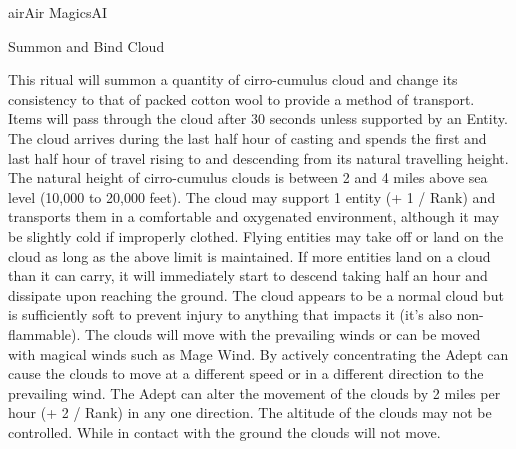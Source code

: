 \begin{College}[2.1]{air}{Air Magics}{AI}
\begin{ritual}[R-4]{Summon and Bind Cloud}
\begin{effects}
This ritual will summon a quantity of cirro-cumulus cloud and change
its consistency to that of packed cotton wool to provide a method of
transport.  Items will pass through the cloud after 30 seconds unless
supported by an Entity.  The cloud arrives during the last half hour
of casting and spends the first and last half hour of travel rising to
and descending from its natural travelling height.  The natural height
of cirro-cumulus clouds is between 2 and 4 miles above sea level
(10,000 to 20,000 feet). The cloud may support 1 entity (+ 1 / Rank)
and transports them in a comfortable and oxygenated environment,
although it may be slightly cold if improperly clothed.  Flying
entities may take off or land on the cloud as long as the above limit
is maintained. If more entities land on a cloud than it can carry, it
will immediately start to descend taking half an hour and dissipate
upon reaching the ground.  The cloud appears to be a normal cloud but
is sufficiently soft to prevent injury to anything that impacts it
(it’s also non-flammable). The clouds will move with the prevailing
winds or can be moved with magical winds such as Mage Wind. By
actively concentrating the Adept can cause the clouds to move at a
different speed or in a different direction to the prevailing wind.
The Adept can alter the movement of the clouds by 2 miles per hour (+
2 / Rank) in any one direction.  The altitude of the clouds may not be
controlled.  While in contact with the ground the clouds will not
move.
\end{effects}
\end{ritual}

\begin{table*}

\end{table*}
\end{College}
